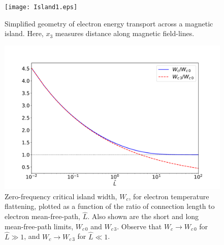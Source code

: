 \documentclass[12pt,prb,aps]{revtex4-1}
\begin{document}
\begin{figure}
\centerline{\texttt{[image: Island1.eps]}}
\caption{Simplified geometry of electron energy transport across a magnetic island. Here, $x_3$ measures distance along magnetic field-lines.  \label{fig2}}
\end{figure}

\begin{figure}
\centerline{\includegraphics[width=1.0\textwidth]{zero.pdf}}
\caption{ Zero-frequency critical island width, $W_c$,  for electron temperature flattening, plotted as a function of the ratio of connection length to electron mean-free-path, $\hat{L}$. Also shown are the short and long mean-free-path limits, $W_{c\,0}$ and $W_{c\,3}$. Observe that $W_c\rightarrow  W_{c\,0}$ for $\hat{L}\gg 1$,   and $W_c\rightarrow W_{c\,3}$ for $\hat{L}\ll 1$. 
\label{fig3}}
\end{figure}
\end{document}

